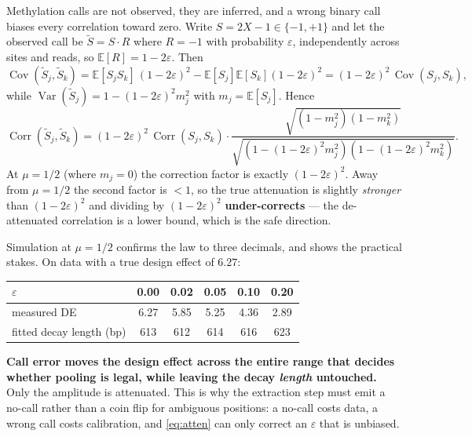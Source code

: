 \documentclass[11pt]{article}
\DeclareMathOperator{\Var}{Var}
\DeclareMathOperator{\Cov}{Cov}
\DeclareMathOperator{\Corr}{Corr}
\begin{document}
Methylation calls are not observed, they are inferred, and a wrong binary call
biases every correlation toward zero. Write $S = 2X - 1 \in \{-1,+1\}$ and let
the observed call be $\tilde S = S\cdot R$ where $R = -1$ with probability
$\varepsilon$, independently across sites and reads, so
$\mathbb{E}[R] = 1 - 2\varepsilon$. Then
\begin{equation}
\Cov(\tilde S_j, \tilde S_k)
= \mathbb{E}[S_jS_k]\,(1-2\varepsilon)^2 - \mathbb{E}[S_j]\mathbb{E}[S_k](1-2\varepsilon)^2
= (1-2\varepsilon)^2\,\Cov(S_j, S_k),
\end{equation}
while $\Var(\tilde S_j) = 1 - (1-2\varepsilon)^2 m_j^2$ with
$m_j = \mathbb{E}[S_j]$. Hence
\begin{equation}
\Corr(\tilde S_j, \tilde S_k)
= (1-2\varepsilon)^2\,\Corr(S_j,S_k)\cdot
\frac{\sqrt{(1-m_j^2)(1-m_k^2)}}
{\sqrt{(1-(1-2\varepsilon)^2m_j^2)(1-(1-2\varepsilon)^2m_k^2)}} .
\label{eq:atten}
\end{equation}
At $\mu = 1/2$ (where $m_j = 0$) the correction factor is exactly
$(1-2\varepsilon)^2$. Away from $\mu = 1/2$ the second factor is $<1$, so the
true attenuation is slightly \emph{stronger} than $(1-2\varepsilon)^2$ and
dividing by $(1-2\varepsilon)^2$ \textbf{under-corrects} --- the de-attenuated
correlation is a lower bound, which is the safe direction.

Simulation at $\mu = 1/2$ confirms the law to three decimals, and shows the
practical stakes. On data with a true design effect of $6.27$:

\begin{center}
\small
\begin{tabular}{lccccc}
\toprule
$\varepsilon$ & 0.00 & 0.02 & 0.05 & 0.10 & 0.20 \\
\midrule
measured DE & 6.27 & 5.85 & 5.25 & 4.36 & 2.89 \\
fitted decay length (bp) & 613 & 612 & 614 & 616 & 623 \\
\bottomrule
\end{tabular}
\end{center}

\textbf{Call error moves the design effect across the entire range that decides
whether pooling is legal, while leaving the decay \emph{length} untouched.} Only
the amplitude is attenuated. This is why the extraction step must emit a no-call
rather than a coin flip for ambiguous positions: a no-call costs data, a wrong
call costs calibration, and \eqref{eq:atten} can only correct an $\varepsilon$
that is unbiased.
\end{document}
